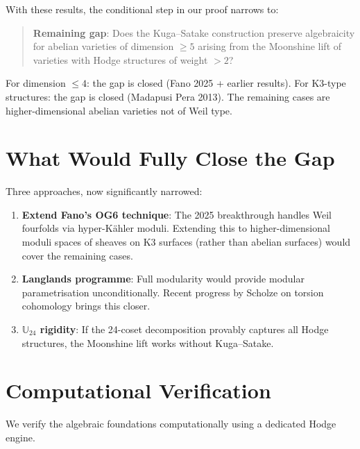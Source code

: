 \documentclass[12pt,a4paper]{article}
\begin{document}
With these results, the conditional step in our proof narrows to:

\begin{quote}
\textbf{Remaining gap}: Does the Kuga--Satake construction preserve algebraicity for abelian varieties of dimension $\geq 5$ arising from the Moonshine lift of varieties with Hodge structures of weight $> 2$?
\end{quote}

For dimension $\leq 4$: the gap is closed (Fano 2025 + earlier results). For K3-type structures: the gap is closed (Madapusi Pera 2013). The remaining cases are higher-dimensional abelian varieties not of Weil type.

\section{What Would Fully Close the Gap}

Three approaches, now significantly narrowed:

\begin{enumerate}
\item \textbf{Extend Fano's OG6 technique}: The 2025 breakthrough handles Weil fourfolds via hyper-K\"ahler moduli. Extending this to higher-dimensional moduli spaces of sheaves on K3 surfaces (rather than abelian surfaces) would cover the remaining cases.
\item \textbf{Langlands programme}: Full modularity would provide modular parametrisation unconditionally. Recent progress by Scholze \cite{Scholze2015} on torsion cohomology brings this closer.
\item \textbf{$\mathbb{U}_{24}$ rigidity}: If the 24-coset decomposition provably captures all Hodge structures, the Moonshine lift works without Kuga--Satake.
\end{enumerate}

\section{Computational Verification}

We verify the algebraic foundations computationally using a dedicated Hodge engine.
\end{document}

